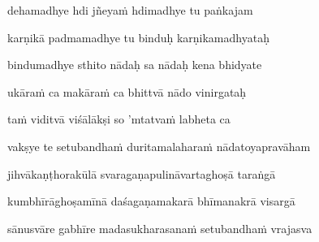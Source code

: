 dehamadhye hdi jñeyaṁ hdimadhye tu paṅkajam \veg\dontdisplaylinenum
{}

karṇikā padmamadhye tu binduḥ karṇikamadhyataḥ\thinspace{\dandab} \dontdisplaylinenum
{}

bindumadhye sthito nādaḥ sa nādaḥ kena bhidyate \veg\dontdisplaylinenum
{}

ukāraṁ ca makāraṁ ca bhittvā nādo vinirgataḥ\thinspace{\dandab} \dontdisplaylinenum
{}

taṁ viditvā viśālākṣi so 'mtatvaṁ labheta ca \veg\dontdisplaylinenum
{}



\ujvers\nemsloka 
vakṣye te setubandhaṁ duritamalaharaṁ nādatoyapravāham
\dontdisplaylinenum
{}

\nemslokab 
jihvākaṇṭhorakūlā svaragaṇapulināvartaghoṣā taraṅgā \danda\dontdisplaylinenum
{}

\nemslokac 
kumbhīrāghoṣamīnā daśagaṇamakarā bhīmanakrā visargā
\dontdisplaylinenum
{}

\nemslokad 
sānusvāre gabhīre madasukharasanaṁ setubandhaṁ vrajasva \veg\dontdisplaylinenum
{}


